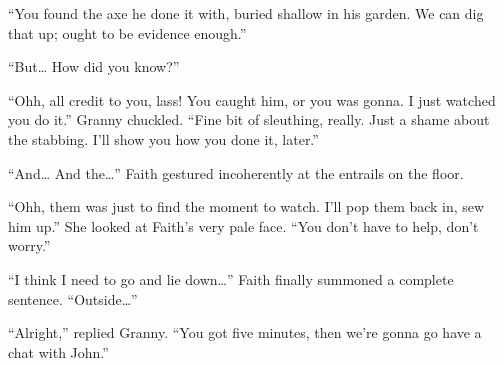 ``You found the axe he done it with, buried shallow in his garden.
We can dig that up; ought to be evidence enough.''

``But{\dots}
How did you know?''

``Ohh, all credit to you, lass!
You caught him, or you was gonna.
I just watched you do it.''
Granny chuckled.
``Fine bit of sleuthing, really.
Just a shame about the stabbing.
I'll show you how you done it, later.''

``And{\dots}
And the{\dots}''
Faith gestured incoherently at the entrails on the floor.

``Ohh, them was just to find the moment to watch.
I'll pop them back in, sew him up.''
She looked at Faith's very pale face.
``You don't have to help, don't worry.''

``I think I need to go and lie down{\dots}''
Faith finally summoned a complete sentence.
``Outside{\dots}''

``Alright,''
replied Granny.
``You got five minutes, then we're gonna go have a chat with John.''
